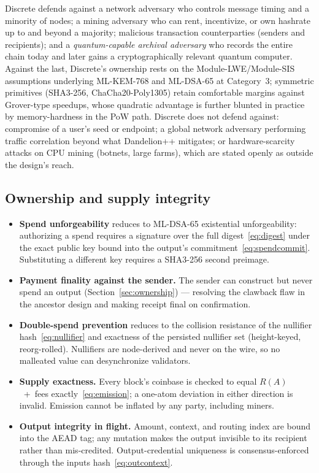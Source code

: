 \documentclass[11pt,a4paper]{article}
\begin{document}
Discrete defends against a network adversary who controls message timing and
a minority of nodes; a mining adversary who can rent, incentivize, or own
hashrate up to and beyond a majority; malicious transaction counterparties
(senders and recipients); and a \emph{quantum-capable archival adversary} who
records the entire chain today and later gains a cryptographically relevant
quantum computer. Against the last, Discrete's ownership rests on the
Module-LWE/Module-SIS assumptions underlying ML-KEM-768 and ML-DSA-65 at
Category~3; symmetric primitives (SHA3-256, ChaCha20-Poly1305) retain
comfortable margins against Grover-type speedups, whose quadratic advantage
is further blunted in practice by memory-hardness in the PoW path. Discrete
does not defend against: compromise of a user's seed or endpoint; a global
network adversary performing traffic correlation beyond what Dandelion++
mitigates; or hardware-scarcity attacks on CPU mining (botnets, large farms),
which are stated openly as outside the design's reach.

\subsection{Ownership and supply integrity}

\begin{itemize}
\item \textbf{Spend unforgeability} reduces to ML-DSA-65 existential
  unforgeability: authorizing a spend requires a signature over the full
  digest~\eqref{eq:digest} under the exact public key bound into the output's
  commitment~\eqref{eq:spendcommit}. Substituting a different key requires a
  SHA3-256 second preimage.
\item \textbf{Payment finality against the sender.} The sender can construct
  but never spend an output (Section~\ref{sec:ownership}) --- resolving the
  clawback flaw in the ancestor design and making receipt final on
  confirmation.
\item \textbf{Double-spend prevention} reduces to the collision resistance of
  the nullifier hash~\eqref{eq:nullifier} and exactness of the persisted
  nullifier set (height-keyed, reorg-rolled). Nullifiers are node-derived and
  never on the wire, so no malleated value can desynchronize validators.
\item \textbf{Supply exactness.} Every block's coinbase is checked to equal
  $R(A)$~+~fees exactly~\eqref{eq:emission}; a one-atom deviation in either
  direction is invalid. Emission cannot be inflated by any party, including
  miners.
\item \textbf{Output integrity in flight.} Amount, context, and routing index
  are bound into the AEAD tag; any mutation makes the output invisible to its
  recipient rather than mis-credited. Output-credential uniqueness is
  consensus-enforced through the inputs hash~\eqref{eq:outcontext}.
\end{itemize}
\end{document}
